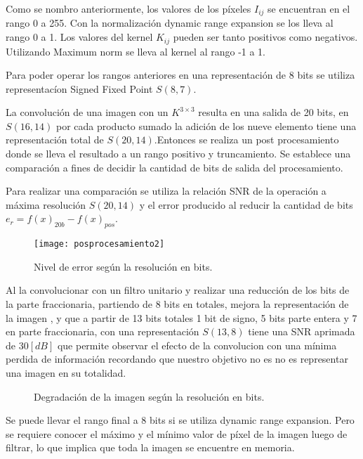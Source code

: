 Como se nombro anteriormente, los valores de los p\'ixeles \(I_{ij}\) se
encuentran en el rango 0 a 255. Con la normalización dynamic range
expansion se los lleva al rango 0 a 1. Los valores del kernel
\(K_{ij}\) pueden ser tanto positivos como negativos. Utilizando Maximum
norm se lleva al kernel al rango -1 a 1.

Para poder operar los rangos anteriores en una representaci\'on de 8 bits se
utiliza representac\'ion Signed Fixed Point\cite{fix_p} \(S(8,7)\). 

La convoluci\'on de una imagen con un $K^{3{\times}3}$ resulta en una 
salida de 20 bits, en \(S(16,14)\) por cada producto sumado la adici\'on de los nueve
elemento tiene una representaci\'on total de \(S(20,14)\).Entonces se realiza un
post procesamiento donde se lleva el resultado a un rango positivo y truncamiento.
Se establece una comparaci\'on a fines de decidir la cantidad de bits de salida del
procesamiento.

Para realizar una comparaci\'on se utiliza la relaci\'on SNR de la operaci\'on a
m\'axima resoluci\'on \(S(20,14)\) y el error producido al reducir la cantidad
de bits ${e_r=f(x)_{20b}-f(x)_{pos}}$\cite{srntesis}.

\begin{figure}
\centering
\texttt{[image: posprocesamiento2]}
\caption{Nivel de error según la resolución en bits.}
\label{prepro}
\end{figure}

Al la convolucionar con un filtro unitario y realizar una reducci\'on de los
bits de la parte fraccionaria, partiendo de 8 bits en totales, mejora la
representaci\'on de la imagen , y que a partir de 13 bits totales 1 bit de
signo, 5 bits parte entera y 7 en parte fraccionaria, con una representación
\(S(13,8)\) tiene una SNR aprimada de \(30 [dB]\) que permite observar el efecto
de la convolucion con una m\'inima perdida de informaci\'on recordando que
nuestro objetivo no es no es representar una imagen en su totalidad.

\begin{figure}[!t]
  \centering
    \hfil %
    \centering
      \caption{Degradación de la imagen según la resolución en bits.}
      \label{prepro2}
    \end{figure}

Se puede llevar el rango final a 8 bits si se utiliza dynamic range expansion.
Pero se requiere conocer el m\'aximo y el m\'inimo valor de p\'ixel de la imagen
luego de filtrar, lo que implica que toda la imagen se encuentre en memoria.

